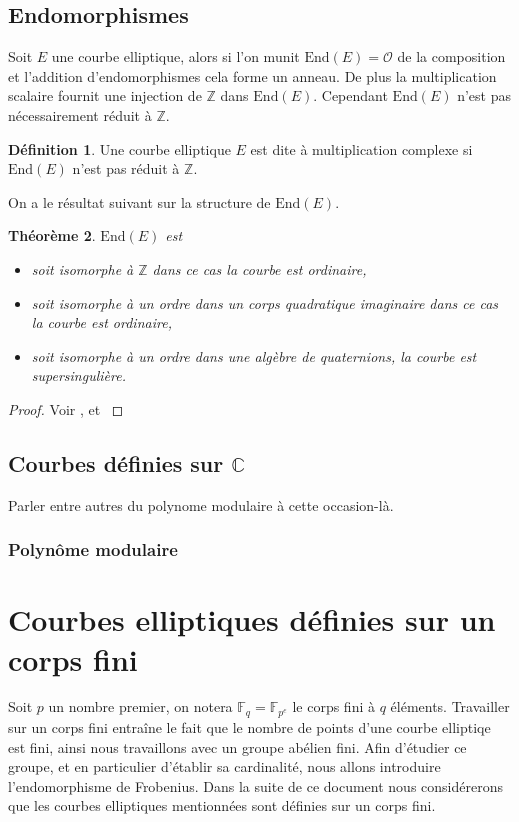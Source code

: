 \documentclass[10pt,a4paper]{book}
\theoremstyle{plain}
\newtheorem{thm}{Théorème}[chapter]
\theoremstyle{definition}
\theoremstyle{definition}
\theoremstyle{definition}
\theoremstyle{definition}
\newtheorem{defi}[thm]{Définition}
\theoremstyle{remark}
\theoremstyle{remark}
\theoremstyle{definition}
\begin{document}
\subsection{Endomorphismes}

Soit $E$ une courbe elliptique, alors si l'on munit $\mathrm{End}(E)=\mathcal{O}$ de la composition et l'addition d'endomorphismes cela forme un anneau. De plus la multiplication scalaire fournit une injection de $\mathbb{Z}$ dans $\mathrm{End}(E)$. Cependant $\mathrm{End}(E)$ n'est pas nécessairement réduit à $\mathbb{Z}$.

\begin{defi}
Une courbe elliptique $E$ est dite à multiplication complexe si $\mathrm{End}(E)$ n'est pas réduit à $\mathbb{Z}$.
\end{defi}
On a le résultat suivant sur la structure de $\mathrm{End}(E)$.

\begin{thm}
$\mathrm{End}(E)$ est
\begin{itemize}
\item soit isomorphe à $\mathbb{Z}$ dans ce cas la courbe est \emph{ordinaire}, 
\item soit isomorphe à un ordre dans un corps quadratique imaginaire dans ce cas la courbe est \emph{ordinaire}, 
\item soit isomorphe à un ordre dans une algèbre de quaternions, la courbe est \emph{supersingulière}. 
\end{itemize}
\end{thm}

\begin{proof}
Voir \cite[Corollary III.9.4]{Silv1}, et \cite[Theorem V.3.1]{Silv1}
\end{proof}

\subsection{Courbes d\'efinies sur $\mathbb{C}$}
Parler entre autres du polynome modulaire à cette occasion-là.
\subsubsection{Polynôme modulaire}


\section{Courbes elliptiques définies sur un corps fini}

Soit $p$ un nombre premier, on notera $\mathbb{F}_q=\mathbb{F}_{p^e}$ le corps 
fini à $q$ éléments. Travailler sur un corps fini entraîne le fait que le 
nombre de points d'une courbe elliptiqe est fini, ainsi nous travaillons avec 
un groupe abélien fini. Afin d'étudier ce groupe, et en particulier d'établir 
sa cardinalité, nous allons introduire l'endomorphisme de Frobenius. Dans la 
suite de ce document nous considérerons que les courbes elliptiques mentionnées
 sont définies sur un corps fini.
\end{document}
